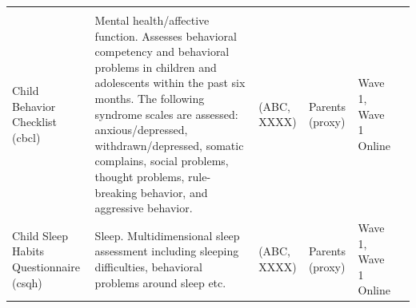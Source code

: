 \documentclass[]{book}
\begin{document}
\begin{longtable}[]{@{}llllll@{}}
\begin{minipage}[t]{0.06\columnwidth}
\strut
\end{minipage} & \begin{minipage}[t]{0.10\columnwidth}\raggedright
\strut
\end{minipage}\tabularnewline
\begin{minipage}[t]{0.18\columnwidth}\raggedright
Child Behavior Checklist (cbcl)\strut
\end{minipage} & \begin{minipage}[t]{0.18\columnwidth}\raggedright
Mental health/affective function. Assesses behavioral competency and behavioral problems in children and adolescents within the past six months. The following syndrome scales are assessed: anxious/depressed, withdrawn/depressed, somatic complains, social problems, thought problems, rule-breaking behavior, and aggressive behavior.\strut
\end{minipage} & \begin{minipage}[t]{0.15\columnwidth}\raggedright
(ABC, XXXX)\strut
\end{minipage} & \begin{minipage}[t]{0.16\columnwidth}\raggedright
Parents (proxy)\strut
\end{minipage} & \begin{minipage}[t]{0.06\columnwidth}\raggedright
Wave 1, Wave 1 Online\strut
\end{minipage} & \begin{minipage}[t]{0.10\columnwidth}\raggedright
\strut
\end{minipage}\tabularnewline
\begin{minipage}[t]{0.18\columnwidth}\raggedright
Child Sleep Habits Questionnaire (csqh)\strut
\end{minipage} & \begin{minipage}[t]{0.18\columnwidth}\raggedright
Sleep. Multidimensional sleep assessment including sleeping difficulties, behavioral problems around sleep etc.\strut
\end{minipage} & \begin{minipage}[t]{0.15\columnwidth}\raggedright
(ABC, XXXX)\strut
\end{minipage} & \begin{minipage}[t]{0.16\columnwidth}\raggedright
Parents (proxy)\strut
\end{minipage} & \begin{minipage}[t]{0.06\columnwidth}\raggedright
Wave 1, Wave 1 Online\strut
\end{minipage} & \begin{minipage}[t]{0.10\columnwidth}\raggedright

\end{minipage}
\end{longtable}
\end{document}
